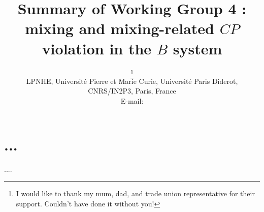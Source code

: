 \documentclass{PoS}
\title{Summary of Working Group 4 : mixing and mixing-related $CP$ violation in the $B$ system}
\author{\speaker{Vladimir V. Gligorov}\thanks{I would like to thank my mum, dad, and trade union representative for their support. Couldn't have done it without you!}\\
        LPNHE, Universit\'{e} Pierre et Marie Curie, Universit\'{e} Paris Diderot, CNRS/IN2P3, Paris, France\\
        E-mail: \email{vgligoro@lpnhe.in2p3.fr}}
\begin{document}
\section{...}

\begin{thebibliography}{99}
....

\end{thebibliography}
\end{document}
